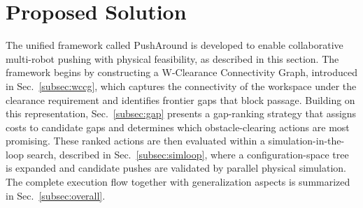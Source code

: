 \section{Proposed Solution}\label{sec:solution}

The unified framework called PushAround is developed to enable collaborative multi-robot pushing
with physical feasibility, as described in this section.
The framework begins by constructing a
W-Clearance Connectivity Graph, introduced in Sec.~\ref{subsec:wccg}, which
captures the connectivity of the workspace under the clearance requirement
and identifies frontier gaps that block passage. Building on this
representation, Sec.~\ref{subsec:gap} presents a gap-ranking strategy that
assigns costs to candidate gaps and determines which obstacle-clearing actions
are most promising. These ranked actions are then evaluated within a
simulation-in-the-loop search, described in Sec.~\ref{subsec:simloop}, where a
configuration-space tree is expanded and candidate pushes are validated by
parallel physical simulation. The complete execution flow together with
generalization aspects is summarized in Sec.~\ref{subsec:overall}.







